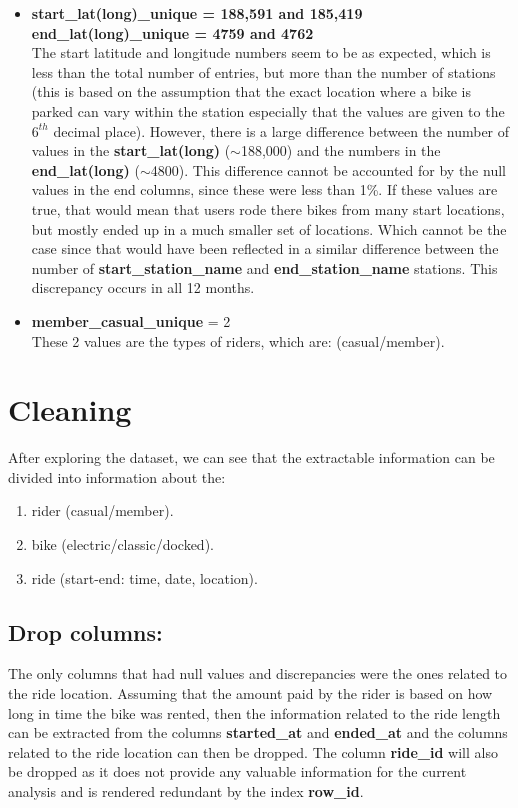 \documentclass[12pt]{article}
\begin{document}
\begin{itemize}
	\item \textbf{start\_lat(long)\_unique = 188,591 and 185,419} \\
	\textbf{end\_lat(long)\_unique = 4759 and 4762} \\
	The start latitude and longitude numbers seem to be as expected, which is less than the total number of entries, but more than the number of stations (this is based on the assumption that the exact location where a bike is parked can vary within the station especially that the values are given to the $6^{th}$ decimal place). However, there is a large difference between the number of values in the \textbf{start\_lat(long)} ($\sim$188,000) and the numbers in the \textbf{end\_lat(long)} ($\sim$4800). This difference cannot be accounted for by the null values in the end columns, since these were less than 1\%. If these values are true, that would mean that users rode there bikes from many start locations, but mostly ended up in a much smaller set of locations. Which cannot be the case since that would have been reflected in a similar difference between the number of \textbf{start\_station\_name} and \textbf{end\_station\_name} stations. This discrepancy occurs in all 12 months. 
	\item \textbf{member\_casual\_unique} = 2 \\
	These 2 values are the types of riders, which are: (casual/member).
	\end{itemize}

	
\section{Cleaning}
After exploring the dataset, we can see that the extractable information can be divided into information about the:
	\begin{enumerate} 
	\item rider (casual/member).
	\item bike (electric/classic/docked).
	\item ride (start-end: time, date, location).
	\end{enumerate}

\subsection{Drop columns:}
The only columns that had null values and discrepancies were the ones related to the ride location. Assuming that the amount paid by the rider is based on how long in time the bike was rented, then the information related to the ride length can be extracted from the columns \textbf{started\_at} and \textbf{ended\_at} and the columns related to the ride location can then be dropped. The column \textbf{ride\_id} will also be dropped as it does not provide any valuable information for the current analysis and is rendered redundant by the index \textbf{row\_id}. \\
\end{document}
